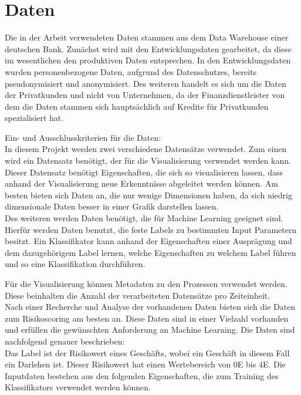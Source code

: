 \chapter{Daten}\label{ch:data}
Die in der Arbeit verwendeten Daten stammen aus dem Data Warehouse einer deutschen Bank.
Zunächst wird mit den Entwicklungsdaten gearbeitet, da diese im wesentlichen den produktiven Daten entsprechen.
In den Entwicklungsdaten wurden personenbezogene Daten, aufgrund des Datenschutzes, bereits pseudonymisiert und anonymisiert.
Des weiteren handelt es sich um die Daten der Privatkunden und nicht von Unternehmen, da der Finanzdienstleister von dem die Daten stammen sich hauptsächlich auf Kredite für Privatkunden spezialisiert hat. 


Ein- und Ausschlusskriterien für die Daten:\\
In diesem Projekt werden zwei verschiedene Datensätze verwendet. 
Zum einen wird ein Datensatz benötigt, der für die Visualisierung verwendet werden kann. 
Dieser Datensatz benötigt Eigenschaften, die sich so visualisieren lassen, dass anhand der Visualisierung neue Erkenntnisse abgeleitet werden können.
Am besten bieten sich Daten an, die nur wenige Dimensionen haben, da sich niedrig dimensionale Daten besser in einer Grafik darstellen lassen. 
\\
Des weiteren werden Daten benötigt, die für Machine Learning geeignet sind. 
Hierfür werden Daten benutzt, die feste Labels zu bestimmten Input Parametern besitzt.
Ein Klassifikator kann anhand der Eigenschaften einer Ausprägung und dem dazugehörigem Label lernen, welche Eigenschaften zu welchem Label führen und so eine Klassifikation durchführen. 


Für die Visualisierung können Metadaten zu den Prozessen verwendet werden.
Diese beinhalten die Anzahl der verarbeiteten Datensätze pro Zeiteinheit.
\\

Nach einer Recherche und Analyse der vorhandenen Daten bieten sich die Daten zum Risikoscoring am besten an.
Diese Daten sind in einer Vielzahl vorhanden und erfüllen die gewünschten Anforderung an Machine Learning. 
Die Daten sind nachfolgend genauer beschrieben: \\
Das Label ist der Risikowert eines Geschäfts, wobei ein Geschäft in diesem Fall ein Darlehen ist.
Dieser Risikowert hat einen Wertebereich von 0E bis 4E.
Die Inputdaten bestehen aus den folgenden Eigenschaften, die zum Training des Klassifikators verwendet werden können. 






